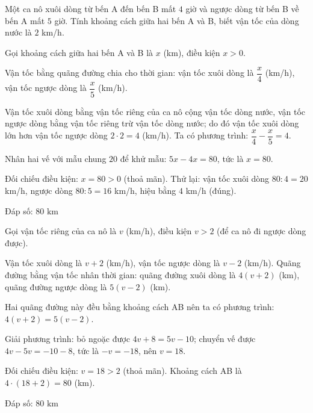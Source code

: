 \begin{problem}[8DS-PT1-007]
Một ca nô xuôi dòng từ bến A đến bến B mất $4$ giờ và ngược dòng từ bến B về bến A mất $5$ giờ. Tính khoảng cách giữa hai bến A và B, biết vận tốc của dòng nước là $2$ km/h.

\begin{solution}
Gọi khoảng cách giữa hai bến A và B là $x$ (km), điều kiện $x > 0$.

Vận tốc bằng quãng đường chia cho thời gian: vận tốc xuôi dòng là $\dfrac{x}{4}$ (km/h), vận tốc ngược dòng là $\dfrac{x}{5}$ (km/h).

Vận tốc xuôi dòng bằng vận tốc riêng của ca nô cộng vận tốc dòng nước, vận tốc ngược dòng bằng vận tốc riêng trừ vận tốc dòng nước; do đó vận tốc xuôi dòng lớn hơn vận tốc ngược dòng $2 \cdot 2 = 4$ (km/h). Ta có phương trình: $\dfrac{x}{4} - \dfrac{x}{5} = 4$.

Nhân hai vế với mẫu chung $20$ để khử mẫu: $5x - 4x = 80$, tức là $x = 80$.

Đối chiếu điều kiện: $x = 80 > 0$ (thoả mãn). Thử lại: vận tốc xuôi dòng $80 : 4 = 20$ km/h, ngược dòng $80 : 5 = 16$ km/h, hiệu bằng $4$ km/h (đúng).

Đáp số: $\boxed{80 \text{ km}}$
\end{solution}

\begin{solution}
Gọi vận tốc riêng của ca nô là $v$ (km/h), điều kiện $v > 2$ (để ca nô đi ngược dòng được).

Vận tốc xuôi dòng là $v + 2$ (km/h), vận tốc ngược dòng là $v - 2$ (km/h). Quãng đường bằng vận tốc nhân thời gian: quãng đường xuôi dòng là $4(v + 2)$ (km), quãng đường ngược dòng là $5(v - 2)$ (km).

Hai quãng đường này đều bằng khoảng cách AB nên ta có phương trình: $4(v + 2) = 5(v - 2)$.

Giải phương trình: bỏ ngoặc được $4v + 8 = 5v - 10$; chuyển vế được $4v - 5v = -10 - 8$, tức là $-v = -18$, nên $v = 18$.

Đối chiếu điều kiện: $v = 18 > 2$ (thoả mãn). Khoảng cách AB là $4 \cdot (18 + 2) = 80$ (km).

Đáp số: $\boxed{80 \text{ km}}$
\end{solution}
\end{problem}

